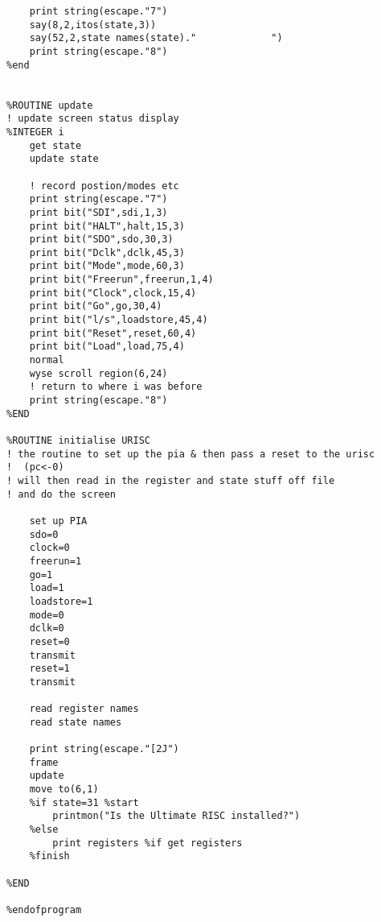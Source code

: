 \begin{verbatim}
    print string(escape."7")
    say(8,2,itos(state,3))
    say(52,2,state names(state)."             ")
    print string(escape."8")
%end


%ROUTINE update
! update screen status display
%INTEGER i
    get state
    update state

    ! record postion/modes etc
    print string(escape."7")
    print bit("SDI",sdi,1,3)
    print bit("HALT",halt,15,3)
    print bit("SDO",sdo,30,3)
    print bit("Dclk",dclk,45,3)
    print bit("Mode",mode,60,3)
    print bit("Freerun",freerun,1,4)
    print bit("Clock",clock,15,4)
    print bit("Go",go,30,4)
    print bit("l/s",loadstore,45,4)
    print bit("Reset",reset,60,4)
    print bit("Load",load,75,4)
    normal 
    wyse scroll region(6,24)
    ! return to where i was before
    print string(escape."8")
%END

%ROUTINE initialise URISC
! the routine to set up the pia & then pass a reset to the urisc
!  (pc<-0)
! will then read in the register and state stuff off file
! and do the screen

    set up PIA
    sdo=0
    clock=0
    freerun=1
    go=1
    load=1
    loadstore=1
    mode=0
    dclk=0
    reset=0
    transmit
    reset=1
    transmit
    
    read register names
    read state names

    print string(escape."[2J")
    frame
    update
    move to(6,1)
    %if state=31 %start
        printmon("Is the Ultimate RISC installed?")
    %else
        print registers %if get registers
    %finish
    
%END

%endofprogram
\end{verbatim}
